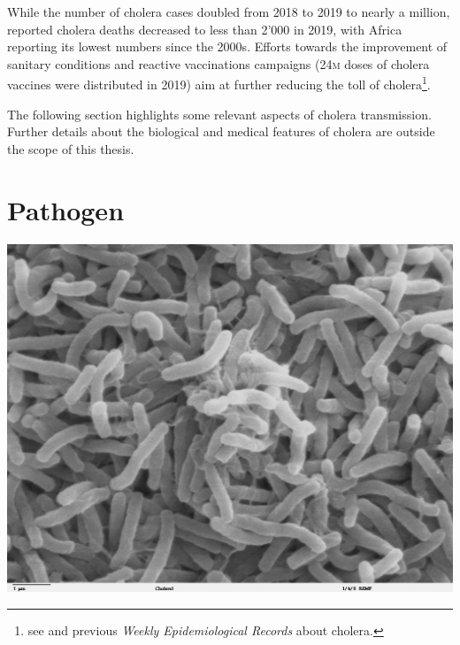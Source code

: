While the number of cholera cases doubled from 2018 to 2019 to nearly a million, reported cholera deaths decreased to less than 2'000 in 2019, with Africa reporting its lowest numbers since the 2000s. Efforts towards the improvement of sanitary conditions and reactive vaccinations campaigns (24\textsc{m} doses of cholera vaccines were distributed in 2019) aim at further reducing the toll of cholera\footnote{see  and previous \textit{Weekly Epidemiological Records} about cholera.}. 

The following section highlights some relevant aspects of cholera transmission. Further details about the biological and medical features of cholera are outside the scope of this thesis.

\section{Pathogen} 
\begin{marginfigure}[6\baselineskip]
\centering
\includegraphics{fig/vibrio}
\label{fig:bacteria}
\end{marginfigure}
